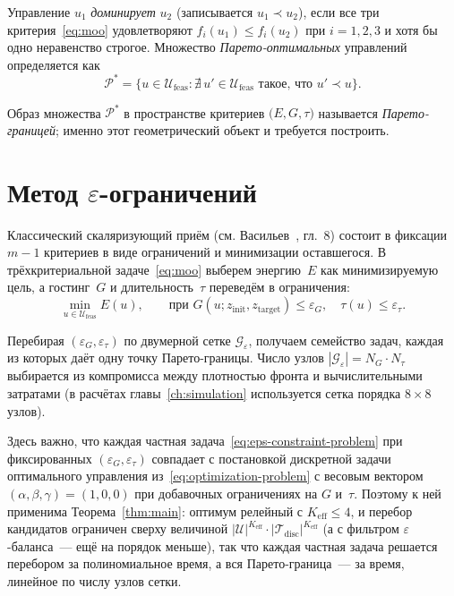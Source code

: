 \begin{definition}\label{def:pareto-dom}
    Управление $u_1$ \emph{доминирует} $u_2$ (записывается $u_1 \prec u_2$),
    если все три критерия~\eqref{eq:moo} удовлетворяют $f_i(u_1) \le f_i(u_2)$
    при $i=1,2,3$ и хотя бы одно неравенство строгое. Множество
    \emph{Парето-оптимальных} управлений определяется как
    \begin{equation*}
        \mathcal{P}^{*} = \bigl\{ u \in \mathcal{U}_{\mathrm{feas}} :
            \nexists\, u' \in \mathcal{U}_{\mathrm{feas}} \text{ такое, что } u' \prec u
        \bigr\}.
    \end{equation*}
\end{definition}

Образ множества $\mathcal{P}^{*}$ в пространстве критериев
$\bigl(E, G, \tau\bigr)$ называется \emph{Парето-границей}; именно этот
геометрический объект и требуется построить.


\section{Метод $\varepsilon$-ограничений}\label{sec:eps-constraint}

Классический скаляризующий приём (см. Васильев~\cite{vasiliev2002_methods},
гл.~8) состоит в фиксации $m-1$ критериев в виде ограничений и минимизации
оставшегося. В трёхкритериальной задаче~\eqref{eq:moo} выберем энергию~$E$ как
минимизируемую цель, а гостинг~$G$ и длительность~$\tau$ переведём в
ограничения:
\begin{equation}\label{eq:eps-constraint-problem}
    \min_{u \in \mathcal{U}_{\mathrm{feas}}} E(u),
    \qquad
    \text{при } G(u; z_{\mathrm{init}}, z_{\mathrm{target}}) \le \varepsilon_G,
    \quad \tau(u) \le \varepsilon_{\tau}.
\end{equation}

Перебирая $(\varepsilon_G, \varepsilon_{\tau})$ по двумерной сетке
$\mathcal{G}_{\varepsilon}$, получаем семейство задач, каждая из которых даёт
одну точку Парето-границы. Число узлов
$|\mathcal{G}_{\varepsilon}| = N_G \cdot N_{\tau}$ выбирается из компромисса
между плотностью фронта и вычислительными затратами (в расчётах
главы~\ref{ch:simulation} используется сетка порядка $8 \times 8$ узлов).

Здесь важно, что каждая частная
задача~\eqref{eq:eps-constraint-problem} при фиксированных
$(\varepsilon_G, \varepsilon_{\tau})$ совпадает с постановкой дискретной
задачи оптимального управления из~\eqref{eq:optimization-problem} с весовым
вектором $(\alpha, \beta, \gamma) = (1, 0, 0)$ при добавочных ограничениях на
$G$ и~$\tau$. Поэтому к ней применима Теорема~\ref{thm:main}: оптимум релейный
с $K_{\mathrm{eff}} \le 4$, и перебор кандидатов ограничен сверху величиной
$|\mathcal{U}|^{K_{\mathrm{eff}}} \cdot
|\mathcal{T}_{\mathrm{disc}}|^{K_{\mathrm{eff}}}$ (а с фильтром
$\varepsilon$-баланса~--- ещё на порядок меньше), так что каждая частная
задача решается перебором за полиномиальное время, а вся Парето-граница~---
за время, линейное по числу узлов сетки.


